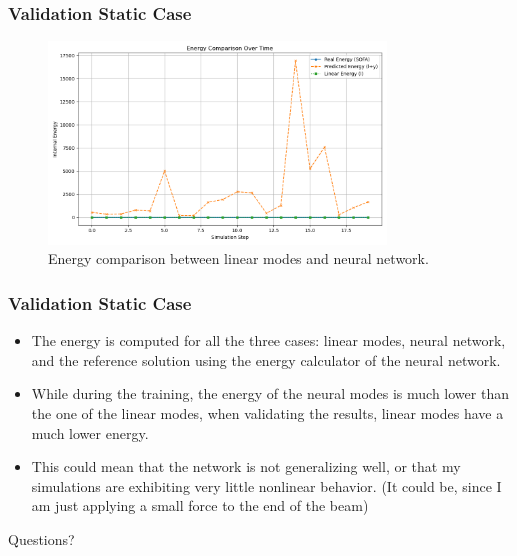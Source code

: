 \documentclass{beamer}
\begin{document}
\begin{frame}
    \frametitle{Validation Static Case}
    
    \begin{figure}
        \centering
        \includegraphics[width=0.8\textwidth]{Images/energy_comparison.png}
        \caption{Energy comparison between linear modes and neural network.}
        \label{fig:energy_comparison}
    \end{figure}

    \end{frame}
\begin{frame}
    \frametitle{Validation Static Case}
    
    \begin{itemize}
        \item The energy is computed for all the three cases: linear modes, neural network, and the reference solution using the energy calculator of the neural network.
        \item While during the training, the energy of the neural modes is much lower than the one of the linear modes, when validating the results, linear modes have a much lower energy.
        \item This could mean that the network is not generalizing well, or that my simulations are exhibiting very little nonlinear behavior. (It could be, since I am just applying a small force to the end of the beam)
    \end{itemize}
\end{frame}
\begin{frame}
    \begin{center}
        \color{blue} \Huge{Questions?}
    \end{center}

\end{frame}
\end{document}
